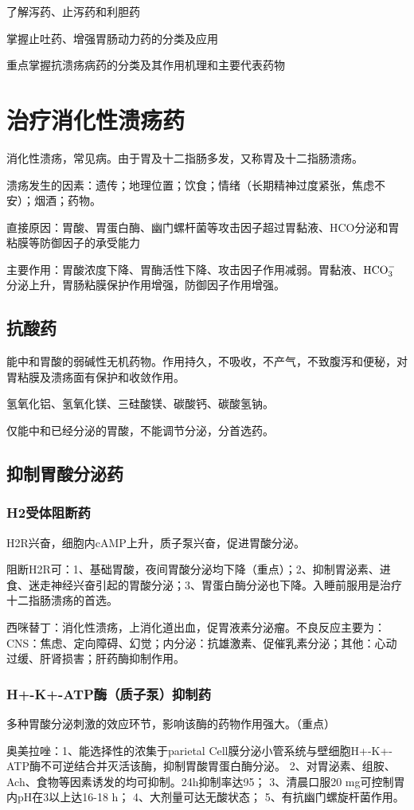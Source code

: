 \documentclass[UTF8]{ctexbook}
\begin{document}
了解泻药、止泻药和利胆药

掌握止吐药、增强胃肠动力药的分类及应用

重点掌握抗溃疡病药的分类及其作用机理和主要代表药物
\section{治疗消化性溃疡药}
消化性溃疡，常见病。由于胃及十二指肠多发，又称胃及十二指肠溃疡。

溃疡发生的因素：遗传；地理位置；饮食；情绪（长期精神过度紧张，焦虑不安）；烟酒；药物。

直接原因：胃酸、胃蛋白酶、幽门螺杆菌等攻击因子超过胃黏液、HCO分泌和胃粘膜等防御因子的承受能力

主要作用：胃酸浓度下降、胃酶活性下降、攻击因子作用减弱。胃黏液、\(\textup{HCO}_{3}^{-}\)分泌上升，胃肠粘膜保护作用增强，防御因子作用增强。
\subsection{抗酸药}
能中和胃酸的弱碱性无机药物。作用持久，不吸收，不产气，不致腹泻和便秘，对胃粘膜及溃疡面有保护和收敛作用。

氢氧化铝、氢氧化镁、三硅酸镁、碳酸钙、碳酸氢钠。

仅能中和已经分泌的胃酸，不能调节分泌，分首选药。
\subsection{抑制胃酸分泌药}
\subsubsection{H2受体阻断药}
H2R兴奋，细胞内cAMP上升，质子泵兴奋，促进胃酸分泌。

阻断H2R可：1、基础胃酸，夜间胃酸分泌均下降（重点）；2、抑制胃泌素、进食、迷走神经兴奋引起的胃酸分泌；3、胃蛋白酶分泌也下降。入睡前服用是治疗十二指肠溃疡的首选。

西咪替丁：消化性溃疡，上消化道出血，促胃液素分泌瘤。不良反应主要为：CNS：焦虑、定向障碍、幻觉；内分泌：抗雄激素、促催乳素分泌；其他：心动过缓、肝肾损害；肝药酶抑制作用。
\subsubsection{H+-K+-ATP酶（质子泵）抑制药}
多种胃酸分泌刺激的效应环节，影响该酶的药物作用强大。（重点）

奥美拉唑：1、能选择性的浓集于parietal Cell膜分泌小管系统与壁细胞H+-K+-ATP酶不可逆结合并灭活该酶，抑制胃酸胃蛋白酶分泌。
2、对胃泌素、组胺、Ach、食物等因素诱发的均可抑制。24h抑制率达95；
3、清晨口服20 mg可控制胃内pH在3以上达16-18 h；
4、大剂量可达无酸状态；
5、有抗幽门螺旋杆菌作用。
\end{document}
